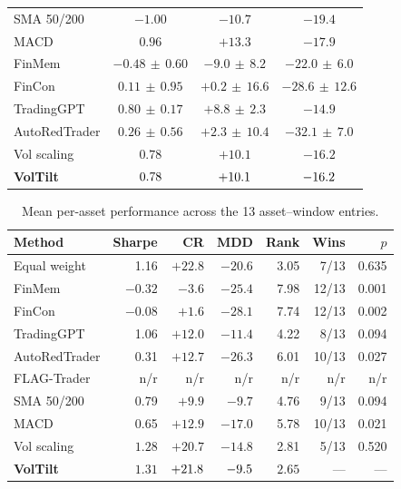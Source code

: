 \begin{table}[!t]
{\begin{tabular*}{\textwidth}{@{\extracolsep{\fill}}lccc}
SMA 50/200 & $-1.00$ & $-10.7$ & $-19.4$ \\
MACD & $0.96$ & $+13.3$ & $-17.9$ \\
FinMem & $-0.48\,{\pm}\,0.60$ & $-9.0\,{\pm}\,8.2$ & $-22.0\,{\pm}\,6.0$ \\
FinCon & $0.11\,{\pm}\,0.95$ & $+0.2\,{\pm}\,16.6$ & $-28.6\,{\pm}\,12.6$ \\
TradingGPT & $0.80\,{\pm}\,0.17$ & $+8.8\,{\pm}\,2.3$ & $\mathbf{-14.9}$ \\
AutoRedTrader & $0.26\,{\pm}\,0.56$ & $+2.3\,{\pm}\,10.4$ & $-32.1\,{\pm}\,7.0$ \\
Vol scaling & $0.78$ & $+10.1$ & $-16.2$ \\
\textbf{VolTilt} & $0.78$ & $+10.1$ & $-16.2$ \\
\bottomrule
\end{tabular*}}
\end{table}

\begin{table}[!b]
\centering
\caption{Mean per-asset performance across the 13 asset--window entries.}
\label{tab:summary}
{\small
\setlength{\tabcolsep}{4pt}
\begin{tabular*}{\textwidth}{@{\extracolsep{\fill}}lrrrrrr}
\toprule
Method & Sharpe & CR & MDD & Rank & Wins & $p$ \\
\midrule
Equal weight & 1.16 & $\mathbf{+22.8}$ & $-20.6$ & 3.05 & 7/13 & 0.635 \\
FinMem & $-0.32$ & $-3.6$ & $-25.4$ & 7.98 & 12/13 & 0.001 \\
FinCon & $-0.08$ & $+1.6$ & $-28.1$ & 7.74 & 12/13 & 0.002 \\
TradingGPT & 1.06 & $+12.0$ & $-11.4$ & 4.22 & 8/13 & 0.094 \\
AutoRedTrader & 0.31 & $+12.7$ & $-26.3$ & 6.01 & 10/13 & 0.027 \\
FLAG-Trader & n/r & n/r & n/r & n/r & n/r & n/r \\
SMA 50/200 & 0.79 & $+9.9$ & $-9.7$ & 4.76 & 9/13 & 0.094 \\
MACD & 0.65 & $+12.9$ & $-17.0$ & 5.78 & 10/13 & 0.021 \\
Vol scaling & $1.28$ & $+20.7$ & $-14.8$ & 2.81 & 5/13 & 0.520 \\
\textbf{VolTilt} & $\mathbf{1.31}$ & $+21.8$ & $-9.5$ & $\mathbf{2.65}$ & --- & --- \\
\bottomrule
\end{tabular*}}
\end{table}

